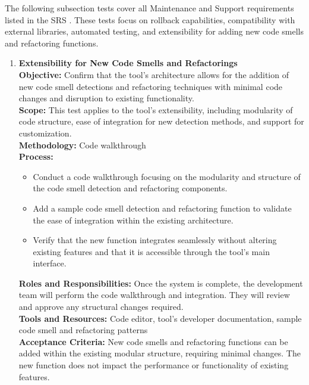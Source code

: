 \documentclass[12pt, titlepage]{article}
\begin{document}
\medskip

\noindent
The following subsection tests cover all Maintenance and Support requirements listed in the SRS \cite{SRS}. These tests focus on rollback capabilities, compatibility with external libraries, automated testing, and extensibility for adding new code smells and refactoring functions.

\begin{enumerate}[label={\bf \textcolor{Maroon}{test-MS-\arabic*}}, wide=0pt, font=\itshape]
  \item \textbf{Extensibility for New Code Smells and Refactorings} \\[2mm]
    \textbf{Objective:} Confirm that the tool’s architecture allows for the addition of new code smell detections and refactoring techniques with minimal code changes and disruption to existing functionality. \\[2mm]
    \textbf{Scope:} This test applies to the tool’s extensibility, including modularity of code structure, ease of integration for new detection methods, and support for customization. \\[2mm]
    \textbf{Methodology:} Code walkthrough \\[2mm]
    \textbf{Process:}
    \begin{itemize}
      \item Conduct a code walkthrough focusing on the modularity and structure of the code smell detection and refactoring components.
      \item Add a sample code smell detection and refactoring function to validate the ease of integration within the existing architecture.
      \item Verify that the new function integrates seamlessly without altering existing features and that it is accessible through the tool’s main interface.
    \end{itemize}
    \textbf{Roles and Responsibilities:} Once the system is complete, the development team will perform the code walkthrough and integration. They will review and approve any structural changes required. \\[2mm]
    \textbf{Tools and Resources:} Code editor, tool’s developer documentation, sample code smell and refactoring patterns \\[2mm]
    \textbf{Acceptance Criteria:} New code smells and refactoring functions can be added within the existing modular structure, requiring minimal changes. The new function does not impact the performance or functionality of existing features.



\end{enumerate}
\end{document}
